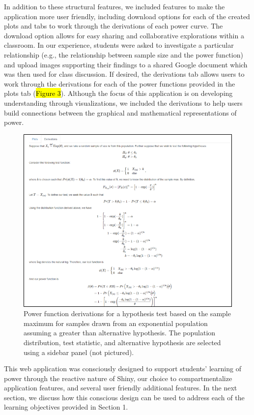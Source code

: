 \documentclass{TISE}
\begin{document}
In addition to these structural features, we included features to make the application more user friendly, including  download options for each of the created plots and tabs to work through the derivations of each power curve. The download option allows for easy sharing and collaborative explorations within a classroom. In our experience, students were asked to investigate a particular relationship (e.g., the relationship between sample size and the power function) and upload images supporting their findings to a shared Google document which was then used for class discussion. If desired, the derivations tab allows users to work through the derivations for each of the power functions provided in the plots tab (\hl{Figure 3}). Although the focus of this application is on developing understanding through visualizations, we included the derivations to help users build connections between the graphical and mathematical representations of power.

\begin{figure}[H]
	\centering
	\includegraphics[scale=1]{derivs.png}
	\caption{Power function derivations for a hypothesis test based on the sample maximum for samples drawn from an exponential population assuming a greater than alternative hypothesis. The population distribution, test statistic, and alternative hypothesis are selected using a sidebar panel (not pictured).}
\end{figure}

This web application was consciously designed to support students' learning of power through the reactive nature of Shiny, our choice to compartmentalize application features, and several user friendly additional features. In the next section, we discuss how this conscious design can be used to address each of the learning objectives provided in Section 1.
\end{document}
